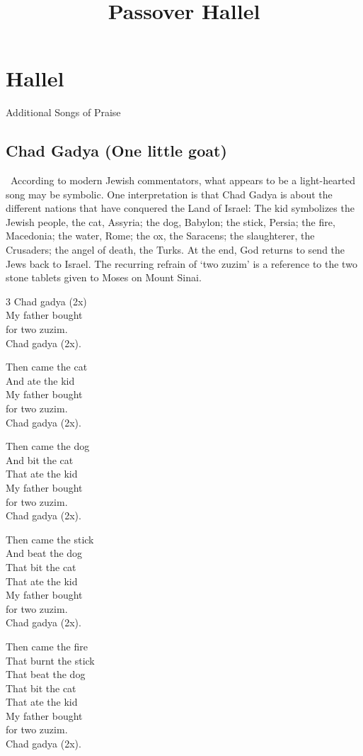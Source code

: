 \documentclass[12pt]{article}
\title{Passover Hallel}
\newcommand{\god}{God}
\newcommand{\sederSection}[2]{
    \section*{#1 \Huge\cjRL{#2}}
}
\newcommand{\newReading}{\faBook{}\ }
\begin{document}
\sederSection{Hallel}{hal*el}

Additional Songs of Praise

\vspace{1ex}
\begin{minipage}[t]{\textwidth}
\subsection*{Chad Gadya (One little goat)}
\newReading According to modern Jewish commentators, what appears to be a light-hearted song may be symbolic. One interpretation is that Chad Gadya is about the different nations that have conquered the Land of Israel: The kid symbolizes the Jewish people, the cat, Assyria; the dog, Babylon; the stick, Persia; the fire, Macedonia; the water, Rome; the ox, the Saracens; the slaughterer, the Crusaders; the angel of death, the Turks. At the end, {\god} returns to send the Jews back to Israel. The recurring refrain of `two zuzim' is a reference to the two stone tablets given to Moses on Mount Sinai. \\

\begin{multicols}{3}
Chad gadya (2x) \\
My father bought \\
for two zuzim. \\
Chad gadya (2x).

Then came the cat \\
And ate the kid \\
My father bought \\
for two zuzim. \\
Chad gadya (2x).

Then came the dog \\
And bit the cat \\
That ate the kid \\
My father bought \\
for two zuzim. \\
Chad gadya (2x).

Then came the stick \\
And beat the dog \\
That bit the cat \\
That ate the kid \\
My father bought \\
for two zuzim. \\
Chad gadya (2x).

Then came the fire \\
That burnt the stick \\
That beat the dog \\
That bit the cat \\
That ate the kid \\
My father bought \\
for two zuzim. \\
Chad gadya (2x).


\end{multicols}
\end{minipage}
\end{document}
